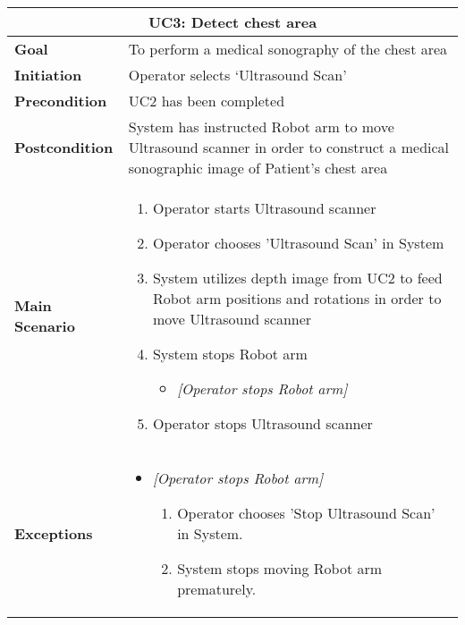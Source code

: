 \documentclass{report}
\begin{document}
\newline
\vspace*{1 cm}
\newline
\begin{tabular}{ | l | p{} | }
  \hline
  \multicolumn{2}{|c|}{\textbf{UC3: Detect chest area}} \\ \hline
  \textbf{Goal} & To perform a medical sonography of the chest area \\ \hline
  \textbf{Initiation} & Operator selects ‘Ultrasound Scan’ \\ \hline
  \textbf{Precondition} & UC2 has been completed \\ \hline
  \textbf{Postcondition} & System has instructed Robot arm to move Ultrasound scanner in order to construct a medical sonographic image of Patient’s chest area  \\ \hline
  \textbf{Main Scenario} & 
  	{\begin{enumerate} 
  	\item Operator starts Ultrasound scanner
  	\item Operator chooses 'Ultrasound Scan' in System
  	\item System utilizes depth image from UC2 to feed Robot arm positions and rotations in order to move Ultrasound scanner
  	\item System stops Robot arm
  		\begin{itemize}
  		\item \textit{[Operator stops Robot arm]}
  		\end{itemize}
  	\item Operator stops Ultrasound scanner
  	\end{enumerate}} \\ \hline
  \textbf{Exceptions} & 
  	{\begin{itemize} 
  	\item \textit{[Operator stops Robot arm]}
  		\begin{enumerate}
  		\item Operator chooses 'Stop Ultrasound Scan' in System.
  		\item System stops moving Robot arm prematurely.
  		\end{enumerate}
  	\end{itemize}} \\ \hline
\end{tabular}
\newline
\vspace*{1 cm}
\newline
\end{document}
